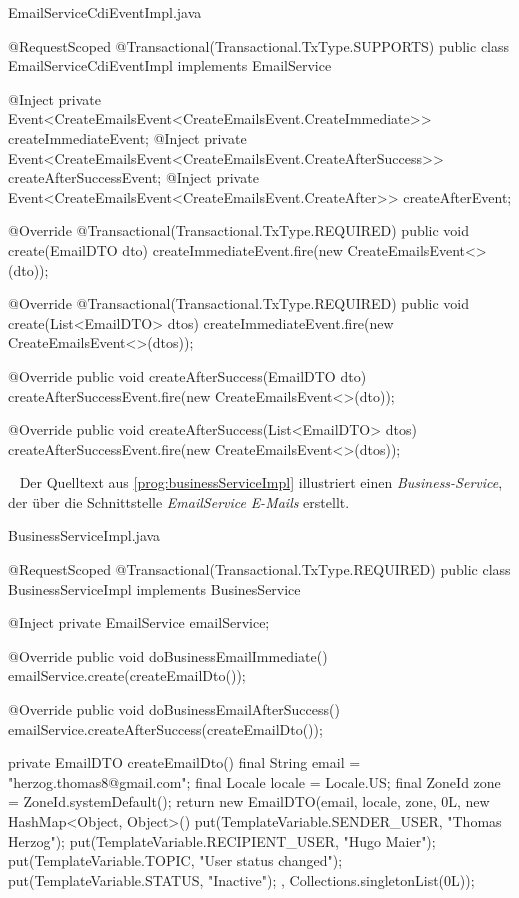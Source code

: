 \begin{program}[h]
\caption{EmailServiceCdiEventImpl.java}
\label{prog:emailServiceCdiEventImpl}
\begin{JavaCode}
@RequestScoped
@Transactional(Transactional.TxType.SUPPORTS)
public class EmailServiceCdiEventImpl implements EmailService {
    @Inject
    private Event<CreateEmailsEvent<CreateEmailsEvent.CreateImmediate>> createImmediateEvent;
    @Inject
    private Event<CreateEmailsEvent<CreateEmailsEvent.CreateAfterSuccess>> createAfterSuccessEvent;
    @Inject
    private Event<CreateEmailsEvent<CreateEmailsEvent.CreateAfter>> createAfterEvent;

    @Override
    @Transactional(Transactional.TxType.REQUIRED)
    public void create(EmailDTO dto) {
        createImmediateEvent.fire(new CreateEmailsEvent<>(dto));
    }

    @Override
    @Transactional(Transactional.TxType.REQUIRED)
    public void create(List<EmailDTO> dtos) {
        createImmediateEvent.fire(new CreateEmailsEvent<>(dtos));
    }

    @Override
    public void createAfterSuccess(EmailDTO dto) {
        createAfterSuccessEvent.fire(new CreateEmailsEvent<>(dto));
    }

    @Override
    public void createAfterSuccess(List<EmailDTO> dtos) {
        createAfterSuccessEvent.fire(new CreateEmailsEvent<>(dtos));
    }
}
\end{JavaCode}
\end{program}
\ \newline 
Der Quelltext aus \ref{prog:businessServiceImpl} illustriert einen \emph{Business-Service}, der über die Schnittstelle \emph{EmailService} \emph{E-Mails} erstellt.
\newpage

\begin{program}[h]
\caption{BusinessServiceImpl.java}
\label{prog:businessServiceImpl}
\begin{JavaCode}
@RequestScoped
@Transactional(Transactional.TxType.REQUIRED)
public class BusinessServiceImpl implements BusinesService {

    @Inject
    private EmailService emailService;

    @Override
    public void doBusinessEmailImmediate() {
        emailService.create(createEmailDto());
    }

    @Override
    public void doBusinessEmailAfterSuccess() {
        emailService.createAfterSuccess(createEmailDto());
    }

    private EmailDTO createEmailDto() {
        final String email = "herzog.thomas8@gmail.com";
        final Locale locale = Locale.US;
        final ZoneId zone = ZoneId.systemDefault();
        return new EmailDTO(email, locale, zone, 0L, 
        	new HashMap<Object, Object>() {{
            	put(TemplateVariable.SENDER_USER, "Thomas Herzog");
           		put(TemplateVariable.RECIPIENT_USER, "Hugo Maier");
            	put(TemplateVariable.TOPIC, "User status changed");
            	put(TemplateVariable.STATUS, "Inactive");
        }}, Collections.singletonList(0L));
    }
}
\end{JavaCode}
\end{program}


